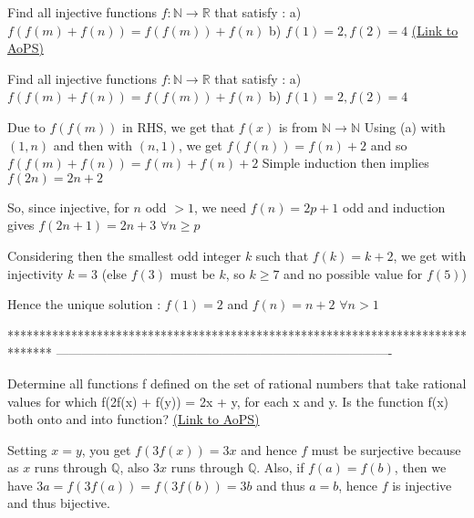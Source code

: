 \begin{problem}
	Find all injective functions $ f : \mathbb{N} \rightarrow \mathbb{R} $ that satisfy :
a) $ f(f(m)+ f(n)) = f(f(m))+ f(n) $ 
b) $ f(1) = 2, f(2) = 4 $
	\flushright \href{https://artofproblemsolving.com/community/c6h609105}{(Link to AoPS)}
\end{problem}



\begin{solution}
	\begin{tcolorbox}Find all injective functions $ f : \mathbb{N} \rightarrow \mathbb{R} $ that satisfy :
a) $ f(f(m)+ f(n)) = f(f(m))+ f(n) $ 
b) $ f(1) = 2, f(2) = 4 $\end{tcolorbox}
Due to $f(f(m))$ in RHS, we get that $f(x)$ is from $\mathbb N\to\mathbb N$
Using (a) with $(1,n)$ and then with $(n,1)$, we get $f(f(n))=f(n)+2$ and so $f(f(m)+f(n))=f(m)+f(n)+2$
Simple induction then implies $f(2n)=2n+2$

So, since injective, for $n$ odd $>1$, we need $f(n)=2p+1$ odd and induction gives $f(2n+1)=2n+3$ $\forall n\ge p$

Considering then the smallest odd integer $k$ such that $f(k)=k+2$, we get with injectivity $k=3$ (else $f(3)$ must be $k$, so $k\ge 7$ and no possible value for $f(5)$)

Hence the unique solution :
$f(1)=2$ and $f(n)=n+2$ $\forall n>1$
\end{solution}
*******************************************************************************
-------------------------------------------------------------------------------

\begin{problem}
	Determine all functions f defined on the set of rational numbers that take rational values for which 
f(2f(x) + f(y)) = 2x + y, 
for each x and y.     
Is the function f(x)  both onto and into function?
	\flushright \href{https://artofproblemsolving.com/community/c6h609409}{(Link to AoPS)}
\end{problem}



\begin{solution}
	Setting $x=y$, you get $f(3f(x))=3x$ and hence $f$ must be surjective because as $x$ runs through $\mathbb{Q}$, also $3x$ runs through $\mathbb{Q}$.
Also, if $f(a)=f(b)$, then we have $3a=f(3f(a))=f(3f(b))=3b$ and thus $a=b$, hence $f$ is injective and thus bijective.
\end{solution}



